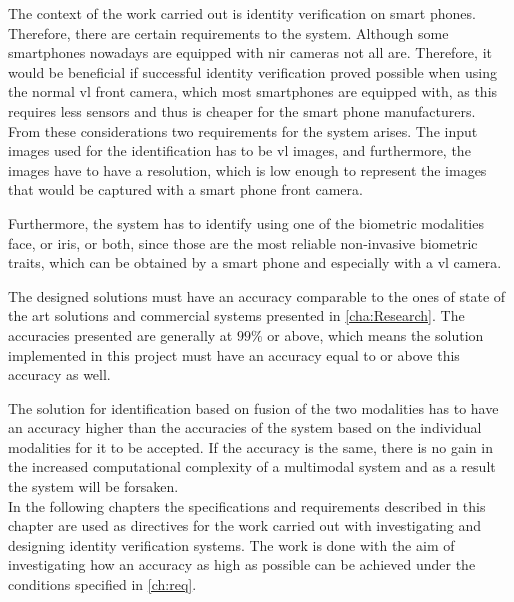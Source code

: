 The context of the work carried out is identity verification on smart phones. Therefore, there are certain requirements to the system. Although some smartphones nowadays are equipped with \gls{nir} cameras not all are. Therefore, it would be beneficial if successful identity verification proved possible when using the normal \gls{vl} front camera, which most smartphones are equipped with, as this requires less sensors and thus is cheaper for the smart phone manufacturers. From these considerations two requirements for the system arises. The input images used for the identification has to be \gls{vl} images, and furthermore, the images have to have a resolution, which is low enough to represent the images that would be captured with a smart phone front camera.

Furthermore, the system has to identify using one of the biometric modalities face, or iris, or both, since those are the most reliable non-invasive biometric traits, which can be obtained by a smart phone and especially with a \gls{vl} camera. 

The designed solutions must have an accuracy comparable to the ones of state of the art solutions and commercial systems presented in \autoref{cha:Research}. The accuracies presented are generally at $99\%$ or above, which means the solution implemented in this project must have an accuracy equal to or above this accuracy as well. 

The solution for identification based on fusion of the two modalities has to have an accuracy higher than the accuracies of the system based on the individual modalities for it to be accepted. If the accuracy is the same, there is no gain in the increased computational complexity of a multimodal system and as a result the system will be forsaken.\\

In the following chapters the specifications and requirements described in this chapter are used as directives for the work carried out with investigating and designing identity verification systems. The work is done with the aim of investigating how an accuracy as high as possible can be achieved under the conditions specified in \autoref{ch:req}. 


